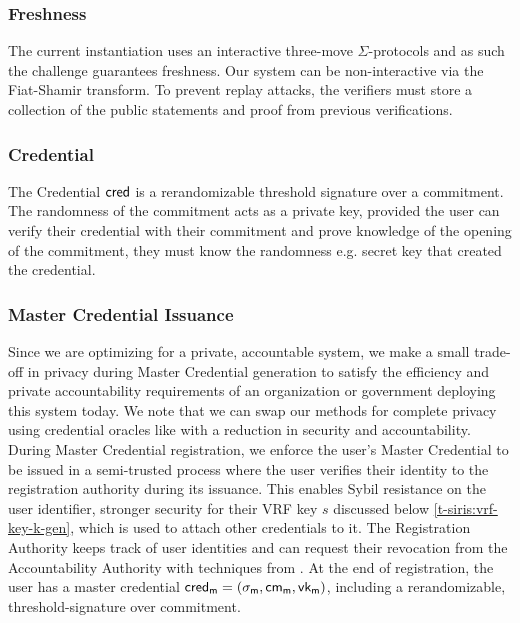 \subsubsection*{Freshness}
The current instantiation uses an interactive three-move $\Sigma$-protocols and as such the challenge guarantees freshness. Our system can be non-interactive via the Fiat-Shamir transform. To prevent replay attacks, the verifiers must store a collection of the public statements and proof from previous verifications. 


\subsubsection*{Credential}
The Credential $\mathsf{cred}$ is a rerandomizable threshold signature over a commitment. The randomness of the commitment acts as a private key, provided the user can verify their credential with their commitment and prove knowledge of the opening of the commitment, they must know the randomness e.g. secret key that created the credential. 


\subsubsection*{Master Credential Issuance}
Since we are optimizing for a private, accountable system, we make a small trade-off in privacy during Master Credential generation to satisfy the efficiency and private accountability requirements of an organization or government deploying this system today. We note that we can swap our methods for complete privacy using credential oracles like \cite{zhang_deco_2020, celi_distefano_2025, baldimtsi_zklogin_2024, ritzdorf_tls-n_2018} with a reduction in security and accountability.
During Master Credential registration, we enforce the user's Master Credential to be issued in a semi-trusted process where the user verifies their identity to the registration authority during its issuance. This enables Sybil resistance on the user identifier, stronger security for their VRF key $s$ discussed below \ref{t-siris:vrf-key-k-gen}, which is used to attach other credentials to it. The Registration Authority keeps track of user identities and can request their revocation from the Accountability Authority with techniques from \cite{damgard_balancing_2020}. At the end of registration, the user has a master credential $\mathsf{cred_m} = (\sigma_{\mathsf{m}}, \mathsf{cm_m}, \mathsf{vk_m})$, including a rerandomizable, threshold-signature over commitment.

